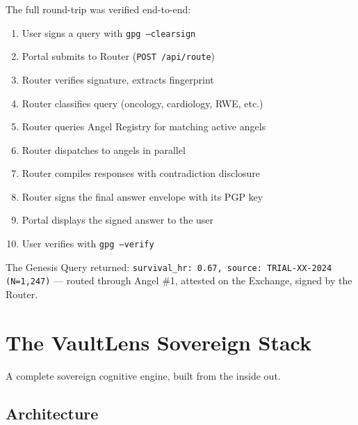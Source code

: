 \documentclass[12pt,a4paper]{article}
\begin{document}
The full round-trip was verified end-to-end:

\begin{enumerate}[nosep]
  \item User signs a query with \texttt{gpg --clearsign}
  \item Portal submits to Router (\texttt{POST /api/route})
  \item Router verifies signature, extracts fingerprint
  \item Router classifies query (oncology, cardiology, RWE, etc.)
  \item Router queries Angel Registry for matching active angels
  \item Router dispatches to angels in parallel
  \item Router compiles responses with contradiction disclosure
  \item Router signs the final answer envelope with its PGP key
  \item Portal displays the signed answer to the user
  \item User verifies with \texttt{gpg --verify}
\end{enumerate}

The Genesis Query returned: \texttt{survival\_hr: 0.67, source:
TRIAL-XX-2024 (N=1,247)} --- routed through Angel \#1, attested on the
Exchange, signed by the Router.

\clearpage

\section{The VaultLens Sovereign Stack}

A complete sovereign cognitive engine, built from the inside out.

\subsection{Architecture}
\end{document}
